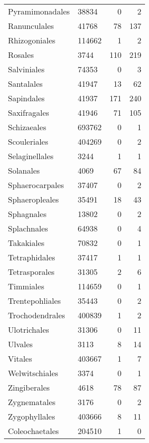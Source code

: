 \documentclass{article}
\begin{document}
\begin{longtabu}{lXRR}
Pyramimonadales & 38834 & 0 & 2\\
Ranunculales & 41768 & 78 & 137\\
Rhizogoniales & 114662 & 1 & 2\\
Rosales & 3744 & 110 & 219\\
Salviniales & 74353 & 0 & 3\\
Santalales & 41947 & 13 & 62\\
Sapindales & 41937 & 171 & 240\\
Saxifragales & 41946 & 71 & 105\\
Schizaeales & 693762 & 0 & 1\\
Scouleriales & 404269 & 0 & 2\\
Selaginellales & 3244 & 1 & 1\\
Solanales & 4069 & 67 & 84\\
Sphaerocarpales & 37407 & 0 & 2\\
Sphaeropleales & 35491 & 18 & 43\\
Sphagnales & 13802 & 0 & 2\\
Splachnales & 64938 & 0 & 4\\
Takakiales & 70832 & 0 & 1\\
Tetraphidales & 37417 & 1 & 1\\
Tetrasporales & 31305 & 2 & 6\\
Timmiales & 114659 & 0 & 1\\
Trentepohliales & 35443 & 0 & 2\\
Trochodendrales & 400839 & 1 & 2\\
Ulotrichales & 31306 & 0 & 11\\
Ulvales & 3113 & 8 & 14\\
Vitales & 403667 & 1 & 7\\
Welwitschiales & 3374 & 0 & 1\\
Zingiberales & 4618 & 78 & 87\\
Zygnematales & 3176 & 0 & 2\\
Zygophyllales & 403666 & 8 & 11\\
Coleochaetales & 204510 & 1 & 0\\
\bottomrule
\end{longtabu}
\end{document}

